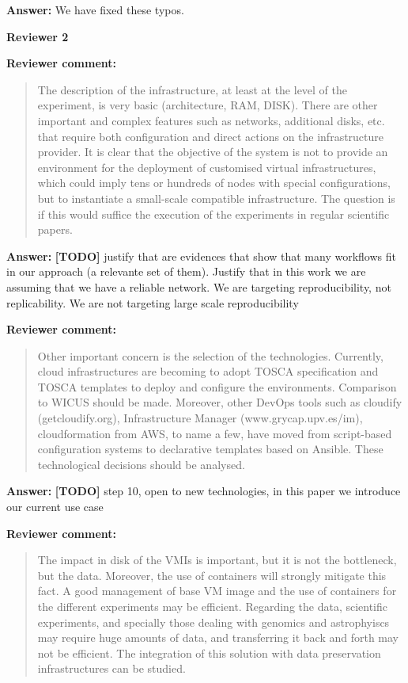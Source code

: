\documentclass{letter}
\newenvironment{review}%
{\textbf{Reviewer comment:}\begin{quote}}%
{\end{quote}}%
\newcommand{\todo}[1]{%
      \color{red}\textbf{[TODO]} #1\color{black}}
\newcommand{\answer}[1]{%
      \textbf{Answer:} #1}
\newcommand{\revised}[1]{\emph{#1}\color{black}}
\begin{document}
\begin{letter}{}
\answer{We have fixed these typos.}



\newpage

%
%
\textbf{Reviewer 2}


\begin{review}
The description of the infrastructure, at least at the level of the experiment, is very basic (architecture, RAM, DISK). There are other important and complex features such as networks, additional disks, etc. that require both configuration and direct actions on the infrastructure provider. It is clear that the objective of the system is not to provide an environment for the deployment of customised virtual infrastructures, which could imply tens or hundreds of nodes with special configurations, but to instantiate a small-scale compatible infrastructure. The question is if this would suffice the execution of the experiments in regular scientific papers.
\end{review}

\answer{\todo{justify that are evidences that show that many workflows fit in our approach (a relevante set of them). Justify that in this work we are assuming that we have a reliable network. We are targeting reproducibility, not replicability. We are not targeting large scale reproducibility}}

\revised{}


\begin{review}
Other important concern is the selection of the technologies. Currently, cloud infrastructures are becoming to adopt TOSCA specification and TOSCA templates to deploy and configure the environments. Comparison to WICUS should be made. Moreover, other DevOps tools such as cloudify (getcloudify.org), Infrastructure Manager (www.grycap.upv.es/im), cloudformation from AWS, to name a few, have moved from script-based configuration systems to declarative templates based on Ansible. These technological decisions should be analysed.
\end{review}

\answer{\todo{step 10, open to new technologies, in this paper we introduce our current use case}}


\begin{review}
The impact in disk of the VMIs is important, but it is not the bottleneck, but the data. Moreover, the use of containers will strongly mitigate this fact. A good management of base VM image and the use of containers for the different experiments may be efficient. Regarding the data, scientific experiments, and specially those dealing with genomics and astrophyiscs may require huge amounts of data, and transferring it back and forth may not be efficient. The integration of this solution with data preservation infrastructures can be studied.
\end{review}


\end{letter}
\end{document}
